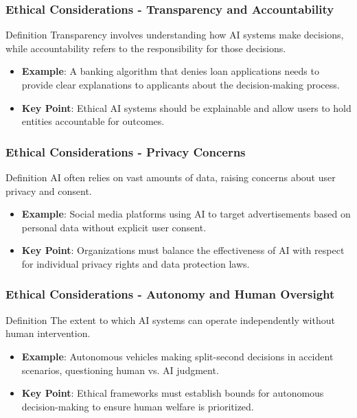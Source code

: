 \documentclass[aspectratio=169]{beamer}
\begin{document}
\begin{frame}[fragile]
    \frametitle{Ethical Considerations - Transparency and Accountability}
    \begin{block}{Definition}
        Transparency involves understanding how AI systems make decisions, while accountability refers to the responsibility for those decisions.
    \end{block}
    \begin{itemize}
        \item \textbf{Example}: A banking algorithm that denies loan applications needs to provide clear explanations to applicants about the decision-making process.
        \item \textbf{Key Point}: Ethical AI systems should be explainable and allow users to hold entities accountable for outcomes.
    \end{itemize}
\end{frame}

\begin{frame}[fragile]
    \frametitle{Ethical Considerations - Privacy Concerns}
    \begin{block}{Definition}
        AI often relies on vast amounts of data, raising concerns about user privacy and consent.
    \end{block}
    \begin{itemize}
        \item \textbf{Example}: Social media platforms using AI to target advertisements based on personal data without explicit user consent.
        \item \textbf{Key Point}: Organizations must balance the effectiveness of AI with respect for individual privacy rights and data protection laws.
    \end{itemize}
\end{frame}

\begin{frame}[fragile]
    \frametitle{Ethical Considerations - Autonomy and Human Oversight}
    \begin{block}{Definition}
        The extent to which AI systems can operate independently without human intervention.
    \end{block}
    \begin{itemize}
        \item \textbf{Example}: Autonomous vehicles making split-second decisions in accident scenarios, questioning human vs. AI judgment.
        \item \textbf{Key Point}: Ethical frameworks must establish bounds for autonomous decision-making to ensure human welfare is prioritized.
    \end{itemize}
\end{frame}
\end{document}
